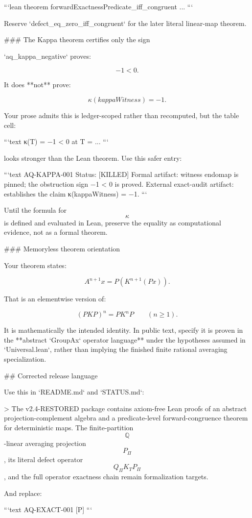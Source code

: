 ```lean
theorem forwardExactnessPredicate_iff_congruent ...
```

Reserve `defect_eq_zero_iff_congruent` for the later literal linear-map theorem.

### The Kappa theorem certifies only the sign

`aq_kappa_negative` proves:

$$
-1<0.
$$

It does **not** prove:

$$
\kappa(kappaWitness)=-1.
$$

Your prose admits this is ledger-scoped rather than recomputed, but the table cell:

```text
κ(T) = −1 < 0 at T = ...
```

looks stronger than the Lean theorem. Use this safer entry:

```text
AQ-KAPPA-001
Status: [KILLED]
Formal artifact: witness endomap is pinned; the obstruction sign −1 < 0 is proved.
External exact-audit artifact: establishes the claim κ(kappaWitness) = −1.
```

Until the formula for $$\kappa$$ is defined and evaluated in Lean, preserve the equality as computational evidence, not as a formal theorem.

### Memoryless theorem orientation

Your theorem states:

$$
A^{n+1}x
=
P(K^{n+1}(Px)).
$$

That is an elementwise version of:

$$
(PKP)^n
=
PK^nP
\qquad(n\ge1).
$$

It is mathematically the intended identity. In public text, specify it is proven in the **abstract `GroupAx` operator language** under the hypotheses assumed in `Universal.lean`, rather than implying the finished finite rational averaging specialization.

## Corrected release language

Use this in `README.md` and `STATUS.md`:

> The v2.4-RESTORED package contains axiom-free Lean proofs of an abstract projection-complement algebra and a predicate-level forward-congruence theorem for deterministic maps. The finite-partition $$\mathbb Q$$-linear averaging projection $$P_\Pi$$, its literal defect operator $$Q_\Pi K_TP_\Pi$$, and the full operator exactness chain remain formalization targets.

And replace:

```text
AQ-EXACT-001 [P]
```

